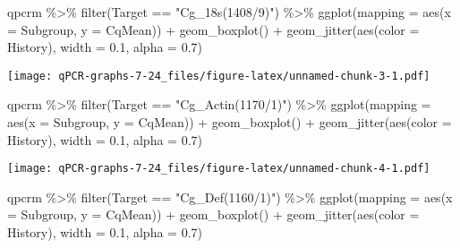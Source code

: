 \documentclass[
]{article}
\newenvironment{Shaded}{\begin{snugshade}}{\end{snugshade}}
\newcommand{\AttributeTok}[1]{\textcolor[rgb]{0.77,0.63,0.00}{#1}}
\newcommand{\FloatTok}[1]{\textcolor[rgb]{0.00,0.00,0.81}{#1}}
\newcommand{\FunctionTok}[1]{\textcolor[rgb]{0.00,0.00,0.00}{#1}}
\newcommand{\NormalTok}[1]{#1}
\newcommand{\SpecialCharTok}[1]{\textcolor[rgb]{0.00,0.00,0.00}{#1}}
\newcommand{\StringTok}[1]{\textcolor[rgb]{0.31,0.60,0.02}{#1}}
\begin{document}
\begin{Shaded}
\begin{Highlighting}[]
\NormalTok{qpcrm }\SpecialCharTok{\%\textgreater{}\%}
  \FunctionTok{filter}\NormalTok{(Target }\SpecialCharTok{==} \StringTok{"Cg\_18s(1408/9)"}\NormalTok{) }\SpecialCharTok{\%\textgreater{}\%}
\FunctionTok{ggplot}\NormalTok{(}\AttributeTok{mapping =} \FunctionTok{aes}\NormalTok{(}\AttributeTok{x =}\NormalTok{ Subgroup, }\AttributeTok{y =}\NormalTok{ CqMean)) }\SpecialCharTok{+} 
  \FunctionTok{geom\_boxplot}\NormalTok{()  }\SpecialCharTok{+}
  \FunctionTok{geom\_jitter}\NormalTok{(}\FunctionTok{aes}\NormalTok{(}\AttributeTok{color =}\NormalTok{ History), }\AttributeTok{width =} \FloatTok{0.1}\NormalTok{, }\AttributeTok{alpha =} \FloatTok{0.7}\NormalTok{)}
\end{Highlighting}
\end{Shaded}

\texttt{[image: qPCR-graphs-7-24\_files/figure-latex/unnamed-chunk-3-1.pdf]}

\begin{Shaded}
\begin{Highlighting}[]
\NormalTok{qpcrm }\SpecialCharTok{\%\textgreater{}\%}
  \FunctionTok{filter}\NormalTok{(Target }\SpecialCharTok{==} \StringTok{"Cg\_Actin(1170/1)"}\NormalTok{) }\SpecialCharTok{\%\textgreater{}\%}
\FunctionTok{ggplot}\NormalTok{(}\AttributeTok{mapping =} \FunctionTok{aes}\NormalTok{(}\AttributeTok{x =}\NormalTok{ Subgroup, }\AttributeTok{y =}\NormalTok{ CqMean)) }\SpecialCharTok{+} 
  \FunctionTok{geom\_boxplot}\NormalTok{()  }\SpecialCharTok{+}
  \FunctionTok{geom\_jitter}\NormalTok{(}\FunctionTok{aes}\NormalTok{(}\AttributeTok{color =}\NormalTok{ History), }\AttributeTok{width =} \FloatTok{0.1}\NormalTok{, }\AttributeTok{alpha =} \FloatTok{0.7}\NormalTok{)}
\end{Highlighting}
\end{Shaded}

\texttt{[image: qPCR-graphs-7-24\_files/figure-latex/unnamed-chunk-4-1.pdf]}

\begin{Shaded}
\begin{Highlighting}[]
\NormalTok{qpcrm }\SpecialCharTok{\%\textgreater{}\%}
  \FunctionTok{filter}\NormalTok{(Target }\SpecialCharTok{==} \StringTok{"Cg\_Def(1160/1)"}\NormalTok{) }\SpecialCharTok{\%\textgreater{}\%}
\FunctionTok{ggplot}\NormalTok{(}\AttributeTok{mapping =} \FunctionTok{aes}\NormalTok{(}\AttributeTok{x =}\NormalTok{ Subgroup, }\AttributeTok{y =}\NormalTok{ CqMean)) }\SpecialCharTok{+} 
  \FunctionTok{geom\_boxplot}\NormalTok{()  }\SpecialCharTok{+}
  \FunctionTok{geom\_jitter}\NormalTok{(}\FunctionTok{aes}\NormalTok{(}\AttributeTok{color =}\NormalTok{ History), }\AttributeTok{width =} \FloatTok{0.1}\NormalTok{, }\AttributeTok{alpha =} \FloatTok{0.7}\NormalTok{)}
\end{Highlighting}
\end{Shaded}
\end{document}
